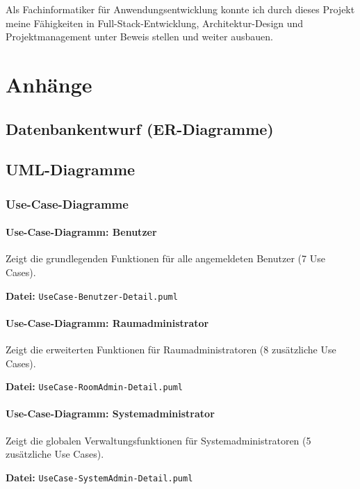 \documentclass[11pt,a4paper]{report}
\begin{document}
Als Fachinformatiker für Anwendungsentwicklung konnte ich durch dieses Projekt meine Fähigkeiten in Full-Stack-Entwicklung, Architektur-Design und Projektmanagement unter Beweis stellen und weiter ausbauen.

\appendix
\chapter{Anhänge}

\section{Datenbankentwurf (ER-Diagramme)}
\label{sec:anhang-er-diagramm}

\section{UML-Diagramme}
\label{sec:anhang-use-case}

\subsection{Use-Case-Diagramme}


\subsubsection{Use-Case-Diagramm: Benutzer}

Zeigt die grundlegenden Funktionen für alle angemeldeten Benutzer (7 Use Cases).

\textbf{Datei:} \texttt{UseCase-Benutzer-Detail.puml}

\subsubsection{Use-Case-Diagramm: Raumadministrator}

Zeigt die erweiterten Funktionen für Raumadministratoren (8 zusätzliche Use Cases).

\textbf{Datei:} \texttt{UseCase-RoomAdmin-Detail.puml}

\subsubsection{Use-Case-Diagramm: Systemadministrator}

Zeigt die globalen Verwaltungsfunktionen für Systemadministratoren (5 zusätzliche Use Cases).

\textbf{Datei:} \texttt{UseCase-SystemAdmin-Detail.puml}
\end{document}
